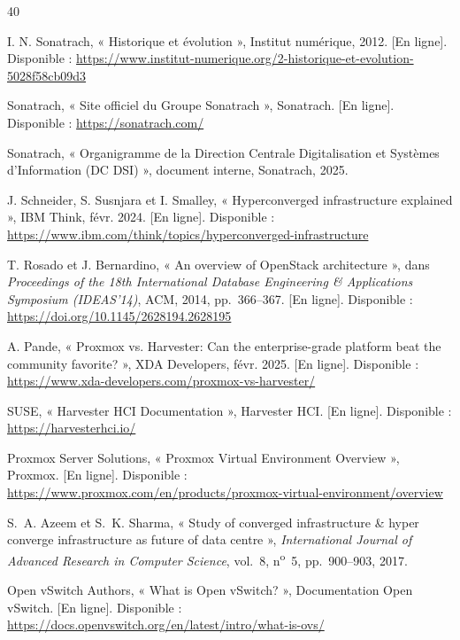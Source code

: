 
\renewcommand{\bibname}{Bibliographie}
\begin{thebibliography}{40}

 I. N. Sonatrach, « Historique et évolution », Institut numérique, 2012. [En ligne]. Disponible : \url{https://www.institut-numerique.org/2-historique-et-evolution-5028f58cb09d3}

 Sonatrach, « Site officiel du Groupe Sonatrach », Sonatrach. [En ligne]. Disponible : \url{https://sonatrach.com/}

 Sonatrach, « Organigramme de la Direction Centrale Digitalisation et Systèmes d'Information (DC DSI) », document interne, Sonatrach, 2025.

 J. Schneider, S. Susnjara et I. Smalley, « Hyperconverged infrastructure explained », IBM Think, févr. 2024. [En ligne]. Disponible : \url{https://www.ibm.com/think/topics/hyperconverged-infrastructure}

 T. Rosado et J. Bernardino, « An overview of OpenStack architecture », dans \textit{Proceedings of the 18th International Database Engineering \& Applications Symposium (IDEAS'14)}, ACM, 2014, pp.~366--367. [En ligne]. Disponible : \url{https://doi.org/10.1145/2628194.2628195}

 A. Pande, « Proxmox vs. Harvester: Can the enterprise-grade platform beat the community favorite? », XDA Developers, févr. 2025. [En ligne]. Disponible : \url{https://www.xda-developers.com/proxmox-vs-harvester/}

 SUSE, « Harvester HCI Documentation », Harvester HCI. [En ligne]. Disponible : \url{https://harvesterhci.io/}

 Proxmox Server Solutions, « Proxmox Virtual Environment Overview », Proxmox. [En ligne]. Disponible : \url{https://www.proxmox.com/en/products/proxmox-virtual-environment/overview}

 S.~A. Azeem et S.~K. Sharma, « Study of converged infrastructure \& hyper converge infrastructure as future of data centre », \textit{International Journal of Advanced Research in Computer Science}, vol.~8, n\textsuperscript{o}~5, pp.~900--903, 2017.

 Open vSwitch Authors, « What is Open vSwitch? », Documentation Open vSwitch. [En ligne]. Disponible : \url{https://docs.openvswitch.org/en/latest/intro/what-is-ovs/}


\end{thebibliography}
